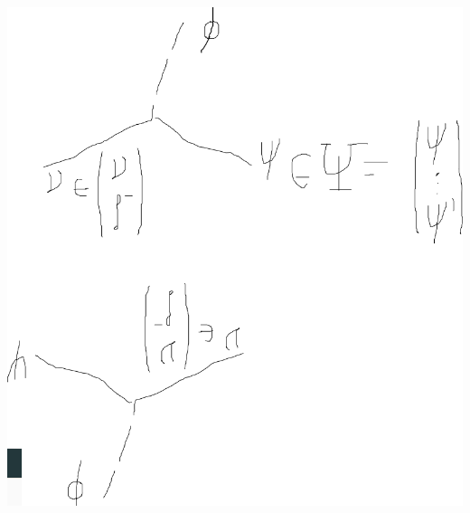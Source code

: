 \documentclass[%
xcolor=dvipsnames,table%
]{beamer}
\begin{document}
\begin{frame}
  \includegraphics[scale=0.3]{preliminar1}
\end{frame}
\end{document}
